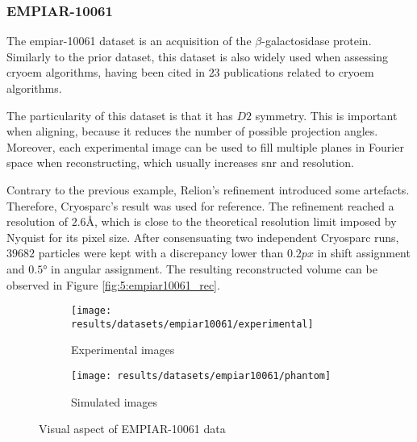 \documentclass[../main.tex]{subfiles}
\begin{document}
\subsubsection{EMPIAR-10061}
The \gls{empiar}-10061 dataset is an acquisition of the $\beta$-galactosidase protein\cite{bartesaghi2015}\cite{empiar10061}. Similarly to the prior dataset, this dataset is also widely used when assessing \gls{cryoem} algorithms, having been cited in $23$ publications related to \gls{cryoem} algorithms. 

The particularity of this dataset is that it has $D2$ symmetry. This is important when aligning, because it reduces the number of possible projection angles. Moreover, each experimental image can be used to fill multiple planes in Fourier space when reconstructing, which usually increases \gls{snr} and resolution.

Contrary to the previous example, Relion's refinement introduced some artefacts. Therefore, Cryosparc's result was used for reference. The refinement reached a resolution of $2.6 \si{\angstrom}$, which is close to the theoretical resolution limit imposed by Nyquist for its pixel size. After consensuating two independent Cryosparc runs, $39682$ particles were kept with a discrepancy lower than $0.2 \si{px}$ in shift assignment and $0.5 \si{\degree}$ in angular assignment. The resulting reconstructed volume can be observed in Figure \ref{fig:5:empiar10061_rec}.

\begin{figure}[htbp]
    \centering
    \begin{subfigure}[b]{0.45\textwidth}
         \centering
         \texttt{[image: results/datasets/empiar10061/experimental]}
         \caption{Experimental images}
    \end{subfigure}
    \hfill
    \begin{subfigure}[b]{0.45\textwidth}
         \centering
         \texttt{[image: results/datasets/empiar10061/phantom]}
         \caption{Simulated images}
    \end{subfigure}
    \caption{Visual aspect of EMPIAR-10061 data}
    \label{fig:5:empiar10061}
\end{figure}
\end{document}
